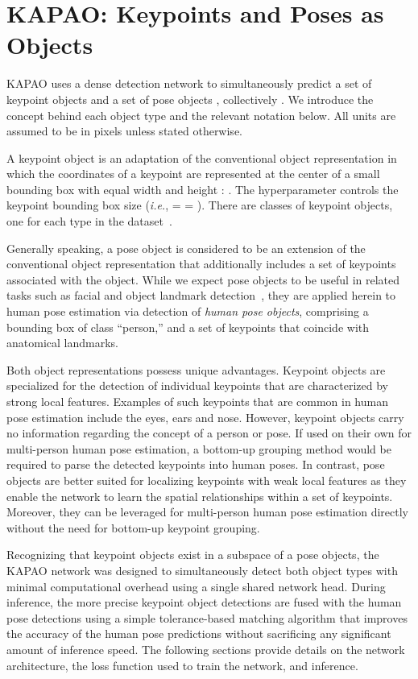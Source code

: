 \documentclass[runningheads]{llncs}
\newcommand{\ie}{\textit{i.e.}}
\newcommand\hlll[1]{\bgroup
  \hskip0pt\color{black}#1\egroup
}
\begin{document}
\section{KAPAO: Keypoints and Poses as Objects}
KAPAO uses a dense detection network to simultaneously predict a set of keypoint objects  and a set of pose objects , collectively . We introduce the concept behind each object type \hlll{and} the relevant notation below. All units are assumed to be in pixels unless stated otherwise.

A keypoint object  is an adaptation of the conventional object representation in which the coordinates of a keypoint are represented at the center  of a small bounding box  with equal width  and height : . The hyperparameter  controls the keypoint bounding box size (\ie,  =  = ). There are  classes of keypoint objects, one for each type in the dataset~\cite{mcnally2021deepdarts}. 

Generally speaking, a pose object  is considered to be an extension of the conventional object representation that additionally includes a set of keypoints associated with the object. While we expect pose objects to be useful in related tasks such as facial and object landmark detection~\cite{xu2021anchorface,jeon2019joint}, they are applied herein to human pose estimation via detection of \textit{human pose objects}, comprising a bounding box of class ``person,'' and a set of keypoints  that coincide with anatomical landmarks.

Both object representations possess unique advantages. Keypoint objects are specialized for the detection of individual keypoints that are characterized by strong local features. Examples of such keypoints that are common in human pose estimation include the eyes, ears and nose. However, keypoint objects carry no information regarding the concept of a person or pose. If used on their own for multi-person human pose estimation, a bottom-up grouping method would be required to parse the detected keypoints into human poses. In contrast, pose objects are better suited for localizing keypoints with weak local features as they enable the network to learn the spatial relationships within a set of keypoints. Moreover, they can be leveraged for multi-person human pose estimation directly without the need for bottom-up keypoint grouping.

Recognizing that keypoint objects exist in a subspace of a pose objects, the KAPAO network was designed to simultaneously detect both object types with minimal computational overhead using a single shared network head. During inference, the more precise keypoint object detections are fused with the human pose detections using a simple tolerance-based matching algorithm that improves the accuracy of the human pose predictions without sacrificing any significant amount of inference speed. The following sections provide details on the network architecture, the loss function used to train the network, and inference.
\end{document}
